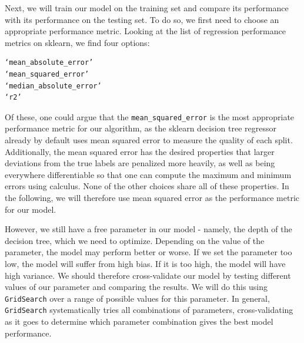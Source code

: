 \documentclass[12 pt]{article}
\numberwithin{equation}{section}
\begin{document}
Next, we will train our model on the training set and compare its performance with its performance on the testing set. To do so, we first need to choose an appropriate performance metric. Looking at the list of regression performance metrics on sklearn, we find four options:
\begin{verbatim} 	 
‘mean_absolute_error’ 
‘mean_squared_error’		 
‘median_absolute_error’		 
‘r2’
\end{verbatim}
Of these, one could argue that the \texttt{mean\_squared\_error} is the most appropriate performance metric for our algorithm, as the sklearn decision tree regressor already by default uses mean squared error to measure the quality of each split. Additionally, the mean squared error has the desired properties that larger deviations from the true labels are penalized more heavily, as well as being everywhere differentiable so that one can compute the maximum and minimum errors using calculus. None of the other choices share all of these properties. In the following, we will therefore use mean squared error as the performance metric for our model.

 However, we still have a free parameter in our model - namely, the depth of the decision tree, which we need to optimize. Depending on the value of the parameter, the model may perform better or worse. If we set the parameter too low, the model will suffer from high bias. If it is too high, the model will have high variance. We should therefore cross-validate our model by testing different values of our parameter and comparing the results. We will do this using \texttt{GridSearch} over a range of possible values for this parameter. In general, \texttt{GridSearch} systematically tries all combinations of parameters, cross-validating as it goes to determine which parameter combination gives the best model performance.
\end{document}
